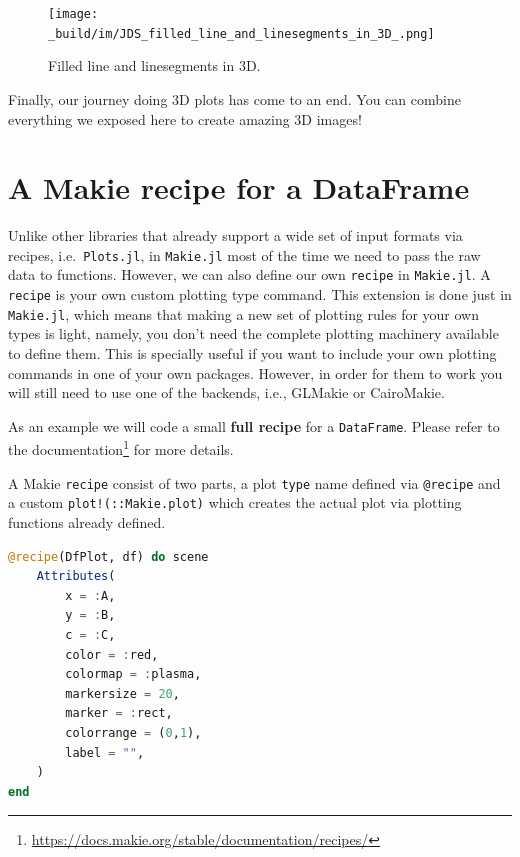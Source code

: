 \documentclass[
  notoc %
]{tufte-book}
\DeclareRobustCommand{\href}[2]{#2\footnote{\url{#1}}}
\newcommand{\passthrough}[1]{#1}
\begin{document}
\begin{figure}
\hypertarget{fig:filled_line_and_linesegments_in_3D}{%
\centering
\texttt{[image: \_build/im/JDS\_filled\_line\_and\_linesegments\_in\_3D\_.png]}
\caption{Filled line and linesegments in
3D.}\label{fig:filled_line_and_linesegments_in_3D}
}
\end{figure}

Finally, our journey doing 3D plots has come to an end. You can combine
everything we exposed here to create amazing 3D images!

\hypertarget{sec:recipe_df}{%
\section{A Makie recipe for a DataFrame}\label{sec:recipe_df}}

Unlike other libraries that already support a wide set of input formats
via recipes, i.e.~\passthrough{\lstinline!Plots.jl!}, in
\passthrough{\lstinline!Makie.jl!} most of the time we need to pass the
raw data to functions. However, we can also define our own
\passthrough{\lstinline!recipe!} in \passthrough{\lstinline!Makie.jl!}.
A \passthrough{\lstinline!recipe!} is your own custom plotting type
command. This extension is done just in
\passthrough{\lstinline!Makie.jl!}, which means that making a new set of
plotting rules for your own types is light, namely, you don't need the
complete plotting machinery available to define them. This is specially
useful if you want to include your own plotting commands in one of your
own packages. However, in order for them to work you will still need to
use one of the backends, i.e., GLMakie or CairoMakie.

As an example we will code a small \textbf{full recipe} for a
\passthrough{\lstinline!DataFrame!}. Please refer to the
\href{https://docs.makie.org/stable/documentation/recipes/}{documentation}
for more details.

A Makie \passthrough{\lstinline!recipe!} consist of two parts, a plot
\passthrough{\lstinline!type!} name defined via
\passthrough{\lstinline!@recipe!} and a custom
\passthrough{\lstinline"plot!(::Makie.plot)"} which creates the actual
plot via plotting functions already defined.

\begin{lstlisting}[language=Julia]
@recipe(DfPlot, df) do scene
    Attributes(
        x = :A,
        y = :B,
        c = :C,
        color = :red,
        colormap = :plasma,
        markersize = 20,
        marker = :rect,
        colorrange = (0,1),
        label = "",
    )
end
\end{lstlisting}
\end{document}
